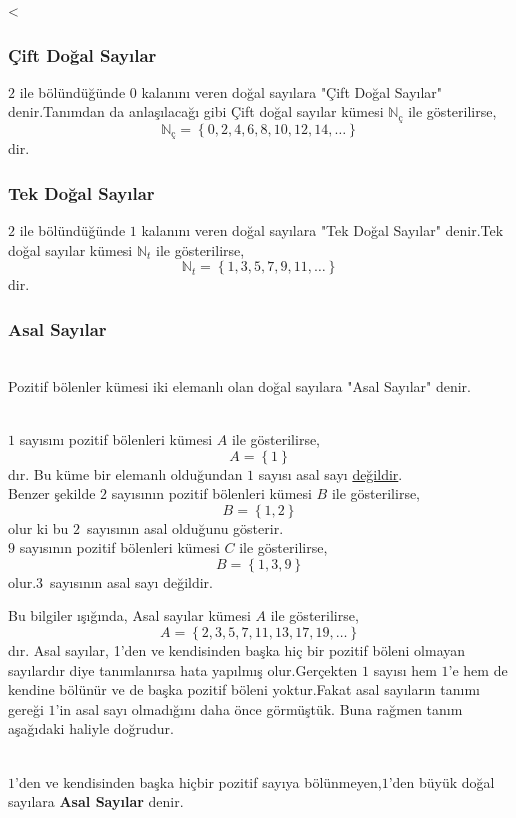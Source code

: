 \textless\documentclass[a4paper,10pt]{book}
\begin{document}
\subsubsection{Çift Doğal Sayılar}
$ 2 $ ile bölündüğünde $ 0 $ kalanını veren doğal sayılara "Çift Doğal Sayılar" denir.Tanımdan da anlaşılacağı gibi
Çift doğal sayılar kümesi $ \mathbb{N}_{\text{ç}} $ ile gösterilirse,
$$ \mathbb{N}_{\text{ç}}=\left\{0,2,4,6,8,10,12,14,\ldots\right\} $$
dir.
\subsubsection{Tek Doğal Sayılar}
$ 2 $ ile bölündüğünde $ 1 $ kalanını veren doğal sayılara "Tek Doğal Sayılar" denir.Tek doğal sayılar kümesi 
$ \mathbb{N}_{t} $ ile gösterilirse,
$$ \mathbb{N}_{t}=\left\{1,3,5,7,9,11,\ldots\right\} $$
dir.

\subsubsection{Asal Sayılar}
\begin{tanim}
	\quad\\
	Pozitif bölenler kümesi iki elemanlı olan doğal sayılara "Asal Sayılar" denir.
\end{tanim}

\begin{ornek}
	\quad\\
	$ 1 $ sayısını pozitif bölenleri kümesi $A$ ile gösterilirse,
	$$ A=\left\{1\right\} $$
	dır.
	Bu küme bir elemanlı olduğundan $ 1 $ sayısı asal sayı \underline{değildir}.\\
	Benzer şekilde $ 2 $ sayısının pozitif bölenleri kümesi $ B $ ile gösterilirse,
	$$ B=\left\{1,2\right\} $$
	olur ki bu $ 2 $ sayısının asal olduğunu gösterir.\\
	$ 9 $ sayısının pozitif bölenleri kümesi $ C $ ile gösterilirse,
	$$ B=\left\{1,3,9\right\} $$
	olur.$ 3 $ sayısının asal sayı değildir.
\end{ornek}
Bu bilgiler ışığında, Asal sayılar kümesi $ A $ ile gösterilirse,
$$ A=\left\{2,3,5,7,11,13,17,19,\ldots\right\} $$
dır.
Asal sayılar, 1'den ve kendisinden başka hiç bir pozitif böleni olmayan sayılardır diye tanımlanırsa hata yapılmış
olur.Gerçekten $ 1 $ sayısı hem $ 1 $'e hem de kendine bölünür ve de başka pozitif böleni yoktur.Fakat asal sayıların
tanımı gereği $ 1 $'in asal sayı olmadığını daha önce görmüştük.
Buna rağmen tanım aşağıdaki haliyle doğrudur.
\begin{tanim}
	\quad\\
	$ 1 $'den ve kendisinden başka hiçbir pozitif sayıya bölünmeyen,$ 1 $'den büyük doğal sayılara \textbf{Asal Sayılar}
	denir.
\end{tanim}
\end{document}
